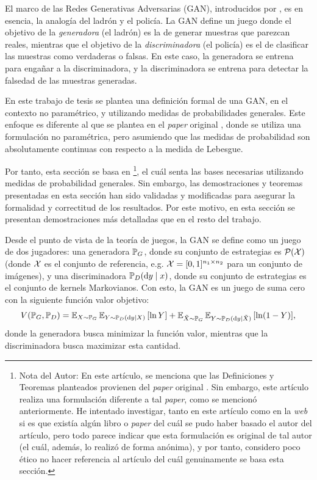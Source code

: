 {{El marco de las Redes Generativas Adversarias (GAN), introducidos por \cite{goodfellow2014generative}, es en esencia, la analogía del ladrón y el policía.
La GAN define un juego donde el objetivo de la \emph{generadora} (el ladrón) es la de generar muestras que parezcan reales, mientras que el objetivo de la \emph{discriminadora} (el policía) es el de clasificar las muestras como verdaderas o falsas.
En este caso, la generadora se entrena para engañar a la discriminadora, y la discriminadora se entrena para detectar la falsedad de las muestras generadas.

En este trabajo de tesis se plantea una definición formal de una GAN, en el contexto no paramétrico, y utilizando medidas de probabilidades generales. Este enfoque es diferente al que se plantea en el \textit{paper} original \cite{goodfellow2014generative}, donde se utiliza una formulación no paramétrica, pero asumiendo que las medidas de probabilidad son absolutamente continuas con respecto a la medida de Lebesgue.

Por tanto, esta sección se basa en \cite{wikipediagan}\footnote{Nota del Autor: En este artículo, se menciona que las Definiciones y Teoremas planteados provienen del \textit{paper} original \cite{goodfellow2014generative}. Sin embargo, este artículo realiza una formulación diferente a tal \textit{paper}, como se mencionó anteriormente. He intentado investigar, tanto en este artículo como en la \textit{web} si es que existía algún libro o \textit{paper} del cuál se pudo haber basado el autor del artículo, pero todo parece indicar que esta formulación es original de tal autor (el cuál, además, lo realizó de forma anónima), y por tanto, considero poco ético no hacer referencia al artículo del cuál genuinamente se basa esta sección.},
el cuál senta las bases necesarias utilizando medidas de probabilidad generales. Sin embargo, las demostraciones y teoremas presentadas en esta sección han sido validadas y modificadas para asegurar la formalidad y correctitud de los resultados. Por este motivo, en esta sección se presentan demostraciones más detalladas que en el resto del trabajo.

Desde el punto de vista de la teoría de juegos, la GAN se define como un juego de dos jugadores: una generadora $\Prob_G$, donde su conjunto de estrategias es $\ProbSpace[\cX]$ (donde $\cX$ es el conjunto de referencia, e.g. $\cX=[0, 1]^{n_1\times n_2}$ para un conjunto de imágenes), y una discriminadora $\Prob_D(\dd y \mid x)$, donde su conjunto de estrategias es el conjunto de kernels Markovianos. Con esto, la GAN es un juego de suma cero con la siguiente función valor objetivo:
\begin{equation}
    \label{eq:gan-objective}
    V(\Prob_G, \Prob_D)
    = \Exp_{X\sim\Prob_G}{\Exp_{Y \sim \Prob_D(\dd y \mid X)} \left[ \ln Y \right]}
    + \Exp_{\tilde X\sim\Prob_G}{\Exp_{Y \sim \Prob_D(\dd y \mid \tilde X)} \left[ \ln (1 - Y) \right]},
\end{equation}
donde la generadora busca minimizar la función valor, mientras que la discriminadora busca maximizar esta cantidad.

}}
